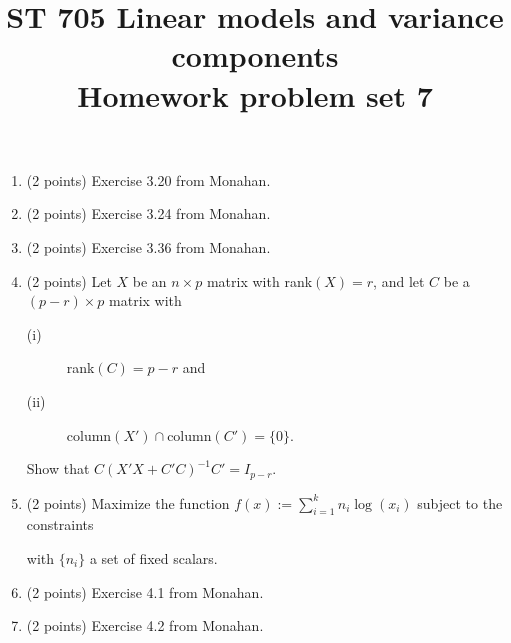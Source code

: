 \documentclass[11pt]{article}
\title{ST 705 Linear models and variance components \\ 
        Homework problem set 7}
\begin{document}
\maketitle

\begin{enumerate}

\item(2 points) Exercise 3.20 from Monahan.

\item(2 points) Exercise 3.24 from Monahan.

\item(2 points) Exercise 3.36 from Monahan.

\item(2 points)  Let $X$ be an $n\times p$ matrix with rank$(X) = r$, and let $C$ be a $(p-r)\times p$ matrix with 
\begin{description}
\item[(i)] rank$(C) = p-r$ and
\item[(ii)] $\text{column}(X') \cap \text{column}(C') = \{0\}$.
\end{description}
Show that $C(X'X + C'C)^{-1}C' = I_{p-r}$.

\item(2 points) Maximize the function $f(x) := \sum_{i=1}^{k}n_{i}\log(x_{i})$ subject to the constraints
with $\{n_{i}\}$ a set of fixed scalars.

\item(2 points) Exercise 4.1 from Monahan.

\item(2 points) Exercise 4.2 from Monahan.

\end{enumerate}
\end{document}
